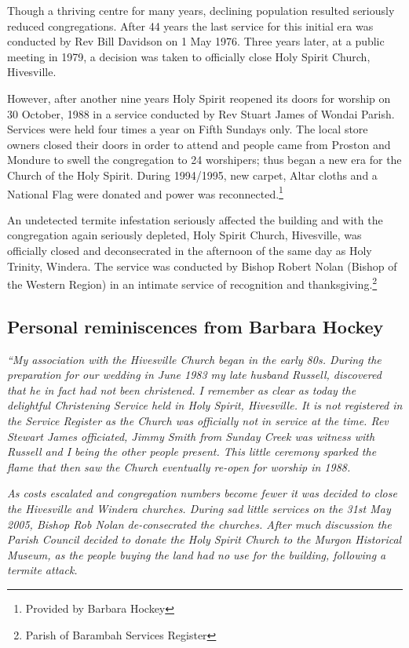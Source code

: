 Though a thriving centre for many years, declining population resulted seriously reduced congregations. After 44 years the last service for this initial era was conducted by Rev Bill Davidson on 1 May 1976. Three years later, at a public meeting in 1979, a decision was taken to officially close Holy Spirit Church, Hivesville.



However, after another nine years Holy Spirit reopened its doors for worship on 30 October, 1988 in a service conducted by Rev Stuart James of Wondai Parish. Services were held four times a year on Fifth Sundays only. The local store owners closed their doors in order to attend and people came from Proston and Mondure to swell the congregation to 24 worshipers; thus began a new era for the Church of the Holy Spirit. During 1994/1995, new carpet, Altar cloths and a National Flag were donated and power was reconnected.\footnote{Provided by Barbara Hockey}


An undetected termite infestation seriously affected the building and with the congregation again seriously depleted, Holy Spirit Church, Hivesville, was officially closed and deconsecrated in the afternoon of the same day as Holy Trinity, Windera. The service was conducted by Bishop Robert Nolan (Bishop of the Western Region) in an intimate service of recognition and thanksgiving.\footnote{Parish of Barambah Services Register}


\subsection{Personal reminiscences from Barbara Hockey}



\emph{``My association with the Hivesville Church began in the early 80s. During the preparation for our wedding in June 1983 my late husband Russell, discovered that he in fact had not been christened. I remember as clear as today the delightful Christening Service held in Holy Spirit, Hivesville. It is not registered in the Service Register as the Church was officially not in service at the time. Rev Stewart James officiated, Jimmy Smith from Sunday Creek was witness with Russell and I being the other people present. This little ceremony sparked the flame that then saw the Church eventually re-open for worship in 1988.}



\emph{As costs escalated and congregation numbers become fewer it was decided to close the Hivesville and Windera churches. During sad little services on the 31st May 2005, Bishop Rob Nolan de-consecrated the churches. After much discussion the Parish Council decided to donate the Holy Spirit Church to the Murgon Historical Museum, as the people buying the land had no use for the building, following a termite attack.}



